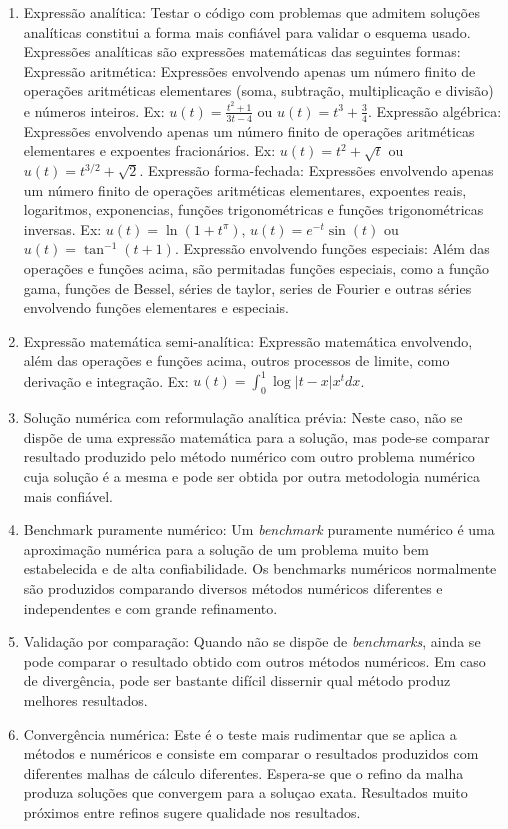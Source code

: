 \begin{enumerate}
\item Expressão analítica: Testar o código com problemas que admitem soluções analíticas constitui a forma mais confiável para validar o esquema usado. Expressões analíticas são expressões matemáticas das seguintes formas:
\subitem Expressão aritmética: Expressões envolvendo apenas um número finito de operações aritméticas elementares (soma, subtração, multiplicação e divisão) e números inteiros. Ex: $u(t)=\frac{t^2+1}{3t-4}$ ou $u(t)=t^3+\frac{3}{4}.$
\subitem Expressão algébrica:  Expressões envolvendo apenas um número finito de operações aritméticas elementares e expoentes fracionários. Ex: $u(t)=t^2+ \sqrt{t} $ ou $u(t)=t^{3/2}+\sqrt{2}$. 
\subitem Expressão forma-fechada: Expressões envolvendo apenas um número finito de operações aritméticas elementares, expoentes reais, logaritmos, exponencias, funções trigonométricas e funções trigonométricas inversas. Ex: $u(t)=\ln(1+t^{\pi})$, $u(t)=e^{-t}\sin(t)$ ou $u(t)=\tan^{-1}(t+1)$.
\subitem Expressão envolvendo funções especiais: Além das operações e funções acima, são permitadas funções especiais, como a função gama, funções de Bessel, séries de taylor, series de Fourier e outras séries envolvendo funções elementares e especiais. 
\item Expressão matemática semi-analítica: Expressão matemática envolvendo, além das operações e funções acima, outros processos de limite, como derivação e integração. Ex: $u(t)=\int_{0}^1 \log|t-x|x^t dx$.  
\item Solução numérica com reformulação analítica prévia: Neste caso, não se dispõe de uma expressão matemática para a solução, mas pode-se comparar resultado produzido pelo método numérico com outro problema numérico cuja solução é a mesma e pode ser obtida por outra metodologia numérica mais confiável. 
\item Benchmark puramente numérico: Um {\it benchmark} puramente numérico é uma aproximação numérica para a solução de um problema muito bem estabelecida e de alta confiabilidade. Os benchmarks numéricos normalmente são produzidos comparando diversos métodos numéricos diferentes e independentes e com grande refinamento.
\item Validação por comparação: Quando não se dispõe de {\it benchmarks}, ainda se pode comparar o resultado obtido com outros métodos numéricos. Em caso de divergência, pode ser bastante difícil dissernir qual método produz melhores resultados.
\item Convergência numérica: Este é o teste mais rudimentar que se aplica a métodos e numéricos e consiste em comparar o resultados produzidos com diferentes malhas de cálculo diferentes. Espera-se que o refino da malha produza soluções que convergem para a soluçao exata. Resultados muito próximos entre refinos sugere qualidade nos resultados.
\end{enumerate}


